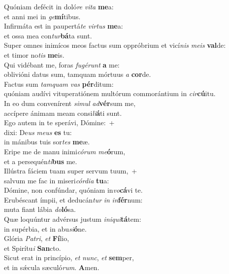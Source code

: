 \evenverse Quóniam defécit in doló\textit{re} \textit{vi}\textit{ta} \textbf{me}a:~\*\\
\evenverse et anni mei in \textit{ge}\textbf{mí}tibus.\\
\oddverse Infirmáta est in paupertá\textit{te} \textit{vir}\textit{tus} \textbf{me}a:~\*\\
\oddverse et ossa mea con\textit{tur}\textbf{bá}ta sunt.\\
\evenverse Super omnes inimícos meos factus sum oppróbrium et vicí\textit{nis} \textit{me}\textit{is} \textbf{val}de:~\*\\
\evenverse et timor no\textit{tis} \textbf{me}is.\\
\oddverse Qui vidébant me, foras \textit{fu}\textit{gé}\textit{runt} \textbf{a} me:~\*\\
\oddverse oblivióni datus sum, tamquam mórtuus \textit{a} \textbf{cor}de.\\
\evenverse Factus sum \textit{tam}\textit{quam} \textit{vas} \textbf{pér}ditum:~\*\\
\evenverse quóniam audívi vituperatiónem multórum commorántium in \textit{cir}\textbf{cú}itu.\\
\oddverse In eo dum convenírent \textit{si}\textit{mul} \textit{ad}\textbf{vér}sum me,~\*\\
\oddverse accípere ánimam meam consi\textit{li}\textbf{á}ti sunt.\\
\evenverse Ego autem in te sperávi, Dómine:~+\\
\evenverse  dixi: De\textit{us} \textit{me}\textit{us} \textbf{es} tu:~\*\\
\evenverse in mánibus tuis sor\textit{tes} \textbf{me}æ.\\
\oddverse Eripe me de manu inimi\textit{có}\textit{rum} \textit{me}\textbf{ó}rum,~\*\\
\oddverse et a persequén\textit{ti}\textbf{bus} me.\\
\evenverse Illústra fáciem tuam super servum tuum,~+\\
\evenverse  salvum me fac in miseri\textit{cór}\textit{di}\textit{a} \textbf{tu}a:~\*\\
\evenverse Dómine, non confúndar, quóniam in\textit{vo}\textbf{cá}vi te.\\
\oddverse Erubéscant ímpii, et deducán\textit{tur} \textit{in} \textit{in}\textbf{fér}num:~\*\\
\oddverse muta fiant lábia \textit{do}\textbf{ló}sa.\\
\evenverse Quæ loquúntur advérsus justum \textit{i}\textit{ni}\textit{qui}\textbf{tá}tem:~\*\\
\evenverse in supérbia, et in abu\textit{si}\textbf{ó}ne.\\
\oddverse Glória \textit{Pa}\textit{tri}, \textit{et} \textbf{Fí}lio,~\*\\
\oddverse et Spirítu\textit{i} \textbf{San}cto.\\
\evenverse Sicut erat in princípio, \textit{et} \textit{nunc}, \textit{et} \textbf{sem}per,~\*\\
\evenverse et in sǽcula sæculó\textit{rum}. \textbf{A}men.\\
